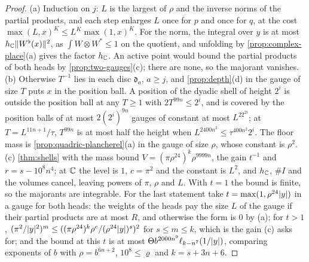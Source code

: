 \begin{proof}
(a) Induction on $j$: $L$ is the largest of $\rho$ and the inverse norms of the partial products, and each step enlarges $L$ once for $p$ and once for $q$, at the cost $\max(L,x)^K\le L^K\max(1,x)^K$. For the norm, the integral over $y$
is at most $h_{\mathbb{C}}\lVert W^\flat(x)\rVert^2$, as $\int W\otimes W^*\le1$ on the quotient, and unfolding by \cref{prop:complex-place}(a) gives the factor $h_{\mathbb{C}}$. An active point would bound the partial products of both heads by
\cref{prop:two-gauges}(c); there are none, so the majorant vanishes. (b) Otherwise $T^{-1}$ lies in each disc $\mathfrak d_a$, $a\ge j$, and \cref{prop:depth}(d) in the gauge of size $T$ puts $x$ in the position ball. A position of the dyadic shell of
height $2^i$ is outside the position ball at any $T\ge1$ with $2T^{99n}\le2^i$, and is covered by the position balls of at most $2(2^i)^{9n}$ gauges of constant at most $L^22^{2i}$; at $T=L^{11n+1}/\tau$, $T^{99n}$ is at most half the height
when $L^{2400n^2}\le\tau^{400n^2}2^i$. The floor mass is \cref{prop:quadric-plancherel}(a) in the gauge of size $\rho$, whose constant is $\rho^2$. (c) \cref{thm:shells} with the mass bound $V=(\pi\rho^{24})^k\rho^{9999n}$, the gain $t^{-1}$ and
$r=s-10^8n^4$; at $\mathbb{C}$ the level is $1$, $c=\pi^2$ and the constant is $L^2$, and $h_{\mathbb{C}}$, $\#I$ and the volumes cancel, leaving powers of $\pi$, $\rho$ and $L$. With $t=1$ the bound is finite, so the majorants are integrable. For the
last statement take $t=\max(1,\rho^{24}\lvert y\rvert)$ in a gauge for both heads: the weights of the heads pay the size $L$ of the gauge if their partial products are at most $R$, and otherwise the form is $0$ by (a); for $t>1$,
$(\pi^2/\lvert y\rvert^2)^m\le((\pi\rho^{24})^k\rho^e/(\rho^{24}\lvert y\rvert)^s)^2$ for $s\le m\le k$, which is the gain (c) asks for; and the bound at this $t$ is at most $\Theta b^{2000n^9}\ell_{k-n^7}(1/\lvert y\rvert)$, comparing exponents of $b$ with
$\rho=b^{6n+2}$, $10^8\le\varrho$ and $k=s+3n+6$.
\end{proof}

